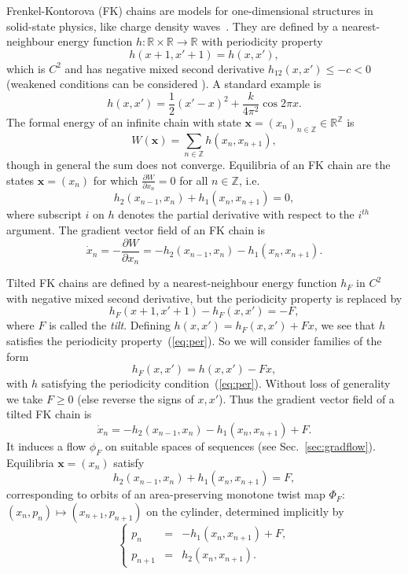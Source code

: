 \documentclass[12pt]{article}
\newcommand{\R}{\mathbb{R}}
\newcommand{\Z}{\mathbb{Z}}
\newcommand{\refer}[1]{~(\ref{#1})}
\newcommand{\xbf}{{\mathbf{x}}}
\begin{document}
Frenkel-Kontorova (FK) chains are models for one-dimensional structures in solid-state physics, like charge density waves~\cite{Gr,Th}.  They are defined by a nearest-neighbour energy function $h: \R\times\R \to \R$ with periodicity property
\begin{equation}
h(x+1,x'+1) = h(x,x'),
\label{eq:per}
\end{equation}
which is $C^2$ and has negative mixed second derivative $h_{12}(x,x') \le -c < 0$ (weakened conditions can be considered \cite{Ban}).
A standard example is
\begin{equation}
h(x,x') = \frac12 (x'-x)^2 + \frac{k}{4\pi^2} \cos{2\pi x}.
\label{eq:stdFK}
\end{equation}
The formal energy of an infinite chain with state $\xbf = (x_n)_{n \in \Z} \in \R^\Z$ is $$W(\xbf) = \sum_{n\in \Z} h(x_n, x_{n+1}),$$
though in general the sum does not converge.
Equilibria of an FK chain are the states $\xbf=(x_n)$ for which $\frac{\partial W}{\partial x_n} = 0$ for all $n \in \Z$, i.e.~$$h_2(x_{n-1},x_n)+h_1(x_n,x_{n+1})=0,$$
where subscript $i$ on $h$ denotes the partial derivative with respect to the $i^{th}$ argument.
The gradient vector field of an FK chain is
$$\dot{x}_n = -\frac{\partial W}{\partial x_n} = -h_2(x_{n-1},x_n)-h_1(x_n,x_{n+1}).$$

Tilted FK chains are defined by a nearest-neighbour energy function $h_F$ in $C^2$ with negative mixed second derivative, but the periodicity property is replaced by $$h_F(x+1,x'+1)-h_F(x,x')=-F,$$ where $F$ is called the {\em tilt}.
Defining $h(x,x')=h_F(x,x')+Fx$, we see that $h$ satisfies the periodicity property\refer{eq:per}.
So we will consider families of the form
\begin{equation}
h_F(x,x')=h(x,x')-Fx,
\label{eq:hF}
\end{equation}
with $h$ satisfying the periodicity condition\refer{eq:per}.  Without loss of generality we take $F\ge 0$ (else reverse the signs of $x,x'$).
Thus the gradient vector field of a tilted FK chain is
\begin{equation}
\dot{x}_n = -h_2 (x_{n-1},x_n)-h_1(x_n,x_{n+1})+F.
\label{tilt}
\end{equation}
It induces a flow $\phi_F$ on suitable spaces of sequences (see Sec.~\ref{sec:gradflow}).
Equilibria $\xbf=(x_n)$ satisfy
\begin{equation}\label{=F}
h_2 (x_{n-1},x_n)+h_1(x_n,x_{n+1})=F,
\end{equation}
corresponding to orbits of an  area-preserving monotone twist map $\Phi_F$: $(x_n,p_n) \mapsto (x_{n+1},p_{n+1})$ on the cylinder, determined implicitly by
\begin{equation}\label{eq:apmap}
\left\{
\begin{array}{lll}
p_n &=& -h_1(x_n,x_{n+1})+F, \\
p_{n+1}&=& h_2(x_n,x_{n+1}).
\end{array}
\right.
\end{equation}
\end{document}
